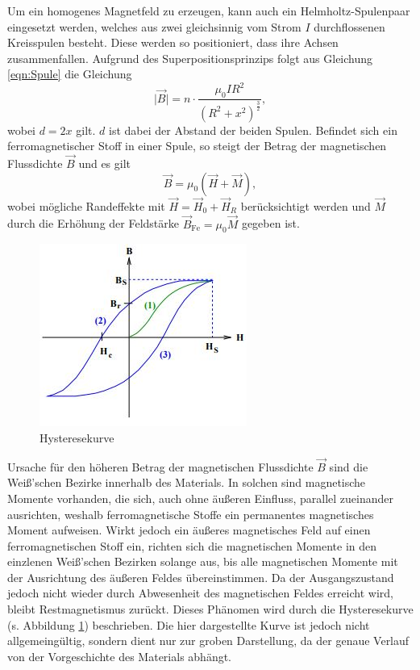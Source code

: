 Um ein homogenes Magnetfeld zu erzeugen, kann auch ein Helmholtz-Spulenpaar eingesetzt werden,
welches aus zwei gleichsinnig vom Strom $I$ durchflossenen Kreisspulen besteht.
Diese werden so positioniert, dass ihre Achsen zusammenfallen.
Aufgrund des Superpositionsprinzips folgt aus Gleichung \eqref{eqn:Spule} die Gleichung
  \begin{equation}
    \lvert \vec{B} \rvert = n\cdot \frac{\mu_0 I R^2}{(R^2 + x^2)^{\frac{3}{2}}} ,
    \label{eqn:bfeld}
  \end{equation}
wobei $d = 2x$ gilt.
$d$ ist dabei der Abstand der beiden Spulen.
Befindet sich ein ferromagnetischer Stoff in einer Spule, so steigt der Betrag der magnetischen Flussdichte $\vec{B}$ und
es gilt
\begin{equation}
  \vec{B}=\mu_0 \left(\vec{H}+\vec{M} \right) , \label{eqn:kbmirwasauszudenken}
\end{equation}
wobei mögliche Randeffekte mit $\vec{H}=\vec{H}_0 + \vec{H}_R$ berücksichtigt werden und $\vec{M}$ durch die
Erhöhung der Feldstärke $\vec{B}_\text{Fe}=\mu_0 \vec{M}$ gegeben ist.

\begin{figure}
  \includegraphics{Text/Bilder/Kurvenverlauf.jpg}
  \caption{Hysteresekurve\cite[3]{sample}}
  \label{figure:HK}
\end{figure}

Ursache für den höheren Betrag der magnetischen Flussdichte $\vec{B}$ sind die Weiß'schen Bezirke innerhalb des Materials.
In solchen sind magnetische Momente vorhanden, die sich, auch ohne äußeren Einfluss, parallel zueinander ausrichten, weshalb
ferromagnetische Stoffe ein permanentes magnetisches Moment aufweisen.
Wirkt jedoch ein äußeres magnetisches Feld auf einen ferromagnetischen Stoff ein, richten sich die magnetischen Momente
in den einzlenen Weiß'schen Bezirken solange aus,
bis alle magnetischen Momente mit der Ausrichtung des äußeren Feldes übereinstimmen.
Da der Ausgangszustand jedoch nicht wieder durch Abwesenheit des magnetischen Feldes erreicht wird, bleibt Restmagnetismus
zurückt.
Dieses Phänomen wird durch die Hysteresekurve (s. Abbildung \ref{figure:HK}) beschrieben.
Die hier dargestellte Kurve ist jedoch nicht allgemeingültig,
sondern dient nur zur groben Darstellung, da der genaue Verlauf von der Vorgeschichte des Materials abhängt.

